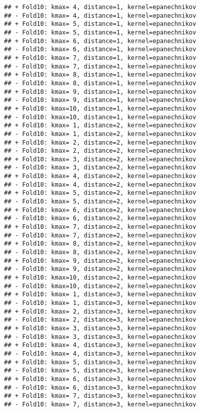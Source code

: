 \documentclass[
]{article}
\begin{document}
\begin{verbatim}
## + Fold10: kmax= 4, distance=1, kernel=epanechnikov 
## - Fold10: kmax= 4, distance=1, kernel=epanechnikov 
## + Fold10: kmax= 5, distance=1, kernel=epanechnikov 
## - Fold10: kmax= 5, distance=1, kernel=epanechnikov 
## + Fold10: kmax= 6, distance=1, kernel=epanechnikov 
## - Fold10: kmax= 6, distance=1, kernel=epanechnikov 
## + Fold10: kmax= 7, distance=1, kernel=epanechnikov 
## - Fold10: kmax= 7, distance=1, kernel=epanechnikov 
## + Fold10: kmax= 8, distance=1, kernel=epanechnikov 
## - Fold10: kmax= 8, distance=1, kernel=epanechnikov 
## + Fold10: kmax= 9, distance=1, kernel=epanechnikov 
## - Fold10: kmax= 9, distance=1, kernel=epanechnikov 
## + Fold10: kmax=10, distance=1, kernel=epanechnikov 
## - Fold10: kmax=10, distance=1, kernel=epanechnikov 
## + Fold10: kmax= 1, distance=2, kernel=epanechnikov 
## - Fold10: kmax= 1, distance=2, kernel=epanechnikov 
## + Fold10: kmax= 2, distance=2, kernel=epanechnikov 
## - Fold10: kmax= 2, distance=2, kernel=epanechnikov 
## + Fold10: kmax= 3, distance=2, kernel=epanechnikov 
## - Fold10: kmax= 3, distance=2, kernel=epanechnikov 
## + Fold10: kmax= 4, distance=2, kernel=epanechnikov 
## - Fold10: kmax= 4, distance=2, kernel=epanechnikov 
## + Fold10: kmax= 5, distance=2, kernel=epanechnikov 
## - Fold10: kmax= 5, distance=2, kernel=epanechnikov 
## + Fold10: kmax= 6, distance=2, kernel=epanechnikov 
## - Fold10: kmax= 6, distance=2, kernel=epanechnikov 
## + Fold10: kmax= 7, distance=2, kernel=epanechnikov 
## - Fold10: kmax= 7, distance=2, kernel=epanechnikov 
## + Fold10: kmax= 8, distance=2, kernel=epanechnikov 
## - Fold10: kmax= 8, distance=2, kernel=epanechnikov 
## + Fold10: kmax= 9, distance=2, kernel=epanechnikov 
## - Fold10: kmax= 9, distance=2, kernel=epanechnikov 
## + Fold10: kmax=10, distance=2, kernel=epanechnikov 
## - Fold10: kmax=10, distance=2, kernel=epanechnikov 
## + Fold10: kmax= 1, distance=3, kernel=epanechnikov 
## - Fold10: kmax= 1, distance=3, kernel=epanechnikov 
## + Fold10: kmax= 2, distance=3, kernel=epanechnikov 
## - Fold10: kmax= 2, distance=3, kernel=epanechnikov 
## + Fold10: kmax= 3, distance=3, kernel=epanechnikov 
## - Fold10: kmax= 3, distance=3, kernel=epanechnikov 
## + Fold10: kmax= 4, distance=3, kernel=epanechnikov 
## - Fold10: kmax= 4, distance=3, kernel=epanechnikov 
## + Fold10: kmax= 5, distance=3, kernel=epanechnikov 
## - Fold10: kmax= 5, distance=3, kernel=epanechnikov 
## + Fold10: kmax= 6, distance=3, kernel=epanechnikov 
## - Fold10: kmax= 6, distance=3, kernel=epanechnikov 
## + Fold10: kmax= 7, distance=3, kernel=epanechnikov 
## - Fold10: kmax= 7, distance=3, kernel=epanechnikov 

\end{verbatim}
\end{document}
